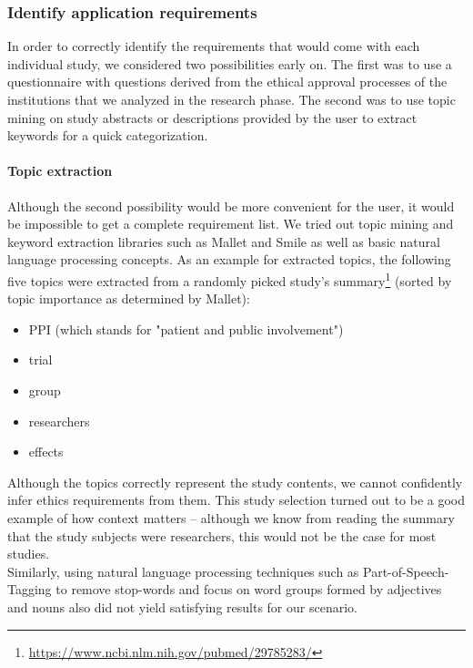 \documentclass[10pt]{article}
\begin{document}
\subsubsection{Identify application requirements}
In order to correctly identify the requirements that would come with each individual study, we considered two possibilities early on. The first was to use a questionnaire with questions derived from the ethical approval processes of the institutions that we analyzed in the research phase. The second was to use topic mining on study abstracts or descriptions provided by the user to extract keywords for a quick categorization. 

\paragraph*{Topic extraction}
Although the second possibility would be more convenient for the user, it would be impossible to get a complete requirement list. We tried out topic mining and keyword extraction libraries such as Mallet \cite{mallet} and Smile \cite{smilekeyword} as well as basic natural language processing concepts. As an example for extracted topics, the following five topics were extracted from a randomly picked study's summary\footnote{\url{https://www.ncbi.nlm.nih.gov/pubmed/29785283/}\label{topicex}}  (sorted by topic importance as determined by Mallet):
\begin{itemize}
\item PPI (which stands for "patient and public involvement")
\item trial
\item group
\item researchers 
\item effects 
\end{itemize}

Although the topics correctly represent the study contents, we cannot confidently infer ethics requirements from them. This study selection turned out to be a good example of how context matters \--- although we know from reading the summary that the study subjects were researchers,  this would not be the case for most studies. \\

 Similarly, using natural language processing techniques such as Part-of-Speech-Tagging to remove stop-words and focus on word groups formed by adjectives and nouns also did not yield satisfying results for our scenario. \\
 
\end{document}
